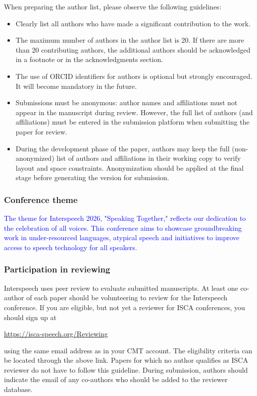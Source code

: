 \documentclass[cameraready]{Interspeech}
\newcommand{\blue}[1]{\textcolor{blue}{#1}}
\begin{document}
{\color{blue}

When preparing the author list, please observe the following guidelines:
\begin{itemize}
\item Clearly list all authors who have made a significant contribution to the work.
\item The maximum number of authors in the author list is 20. If there are more than 20 contributing authors, the additional authors should be acknowledged in a footnote or in the acknowledgments section.
\item The use of ORCID identifiers for authors is optional but strongly encouraged. It will become mandatory in the future.
\item Submissions must be anonymous: author names and affiliations must not appear in the manuscript during review. However, the full list of authors (and affiliations) must be entered in the submission platform when submitting the paper for review.
\item During the development phase of the paper, authors may keep the full (non-anonymized) list of authors and affiliations in their working copy to verify layout and space constraints. Anonymization should be applied at the final stage before generating the version for submission.
\end{itemize}
}




\subsubsection{Conference theme}

\blue{The theme for Interspeech 2026, "Speaking Together," reflects our dedication to the celebration of all voices. This conference aims to showcase groundbreaking work in under-resourced languages, atypical speech and initiatives to improve access to speech technology for all speakers.}

\subsubsection{Participation in reviewing}

Interspeech uses peer review to evaluate submitted manuscripts. At least one co-author of each paper should be volunteering to review for the Interspeech conference. If you are eligible, but not yet a reviewer for ISCA conferences, you should sign up at

\begin{center}
    \url{https://isca-speech.org/Reviewing}
\end{center}
using the same email address as in your CMT account.
The eligibility criteria can be located through the above link. Papers for which no author qualifies as ISCA reviewer do not have to follow this guideline. During submission, authors should indicate the email of any co-authors who should be added to the reviewer database.
\end{document}
